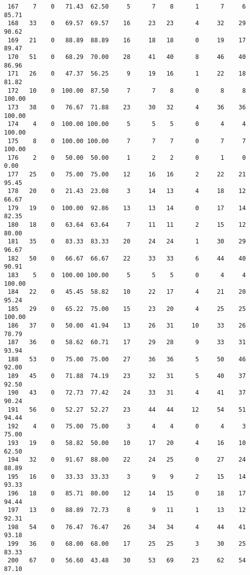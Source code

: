 \begin{verbatim}
 167    7    0   71.43  62.50     5      7    8      1      7     6    85.71
 168   33    0   69.57  69.57    16     23   23      4     32    29    90.62
 169   21    0   88.89  88.89    16     18   18      0     19    17    89.47
 170   51    0   68.29  70.00    28     41   40      8     46    40    86.96
 171   26    0   47.37  56.25     9     19   16      1     22    18    81.82
 172   10    0  100.00  87.50     7      7    8      0      8     8   100.00
 173   38    0   76.67  71.88    23     30   32      4     36    36   100.00
 174    4    0  100.00 100.00     5      5    5      0      4     4   100.00
 175    8    0  100.00 100.00     7      7    7      0      7     7   100.00
 176    2    0   50.00  50.00     1      2    2      0      1     0     0.00
 177   25    0   75.00  75.00    12     16   16      2     22    21    95.45
 178   20    0   21.43  23.08     3     14   13      4     18    12    66.67
 179   19    0  100.00  92.86    13     13   14      0     17    14    82.35
 180   18    0   63.64  63.64     7     11   11      2     15    12    80.00
 181   35    0   83.33  83.33    20     24   24      1     30    29    96.67
 182   50    0   66.67  66.67    22     33   33      6     44    40    90.91
 183    5    0  100.00 100.00     5      5    5      0      4     4   100.00
 184   22    0   45.45  58.82    10     22   17      4     21    20    95.24
 185   29    0   65.22  75.00    15     23   20      4     25    25   100.00
 186   37    0   50.00  41.94    13     26   31     10     33    26    78.79
 187   36    0   58.62  60.71    17     29   28      9     33    31    93.94
 188   53    0   75.00  75.00    27     36   36      5     50    46    92.00
 189   45    0   71.88  74.19    23     32   31      5     40    37    92.50
 190   43    0   72.73  77.42    24     33   31      4     41    37    90.24
 191   56    0   52.27  52.27    23     44   44     12     54    51    94.44
 192    4    0   75.00  75.00     3      4    4      0      4     3    75.00
 193   19    0   58.82  50.00    10     17   20      4     16    10    62.50
 194   32    0   91.67  88.00    22     24   25      0     27    24    88.89
 195   16    0   33.33  33.33     3      9    9      2     15    14    93.33
 196   18    0   85.71  80.00    12     14   15      0     18    17    94.44
 197   13    0   88.89  72.73     8      9   11      1     13    12    92.31
 198   54    0   76.47  76.47    26     34   34      4     44    41    93.18
 199   36    0   68.00  68.00    17     25   25      3     30    25    83.33
 200   67    0   56.60  43.48    30     53   69     23     62    54    87.10

\end{verbatim}
